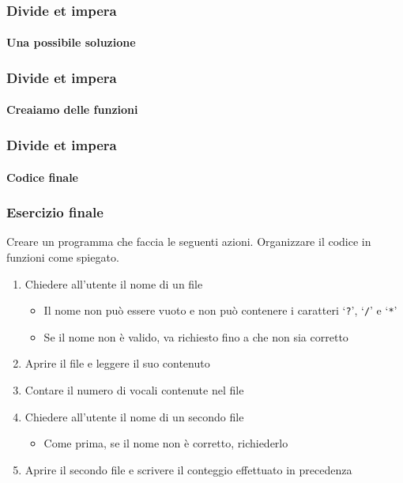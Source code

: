 \begin{exampleframe}
    \frametitle{Divide et impera}
    \framesubtitle{Una possibile soluzione}

    \centering
\end{exampleframe}

\begin{exampleframe}
    \frametitle{Divide et impera}
    \framesubtitle{Creaiamo delle funzioni}

    \centering
\end{exampleframe}

\begin{exampleframe}
    \frametitle{Divide et impera}
    \framesubtitle{Codice finale}

    \centering
\end{exampleframe}

\begin{exerciseframe}
    \frametitle{Esercizio finale}

    Creare un programma che faccia le seguenti azioni.
    Organizzare il codice in funzioni come spiegato.

    \begin{enumerate}
        \item Chiedere all’utente il nome di un file
        \begin{itemize}
            \item Il nome non può essere vuoto e non può contenere i caratteri `\texttt{?}', `\texttt{/}' e `\texttt{*}'
            \item Se il nome non è valido, va richiesto fino a che non sia corretto
        \end{itemize}
        \item Aprire il file e leggere il suo contenuto
        \item Contare il numero di vocali contenute nel file
        \item Chiedere all’utente il nome di un secondo file
        \begin{itemize}
            \item Come prima, se il nome non è corretto, richiederlo
        \end{itemize}
        \item Aprire il secondo file e scrivere il conteggio effettuato in precedenza
    \end{enumerate}
\end{exerciseframe}

